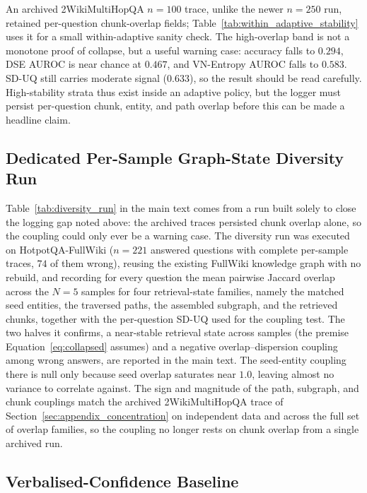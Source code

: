 An archived 2WikiMultiHopQA $n=100$ trace, unlike the newer $n=250$ run,
retained per-question chunk-overlap fields;
Table~\ref{tab:within_adaptive_stability} uses it for a small
within-adaptive sanity check.
The high-overlap band is not a monotone proof of collapse, but a useful
warning case: accuracy falls to $0.294$, DSE AUROC is near chance at $0.467$,
and VN-Entropy AUROC falls to $0.583$.
SD-UQ still carries moderate signal ($0.633$), so the result should be read
carefully.
High-stability strata thus exist inside an adaptive policy, but the logger
must persist per-question chunk, entity, and path overlap before this can be
made a headline claim.



\subsection{Dedicated Per-Sample Graph-State Diversity Run}
\label{sec:appendix_diversity}

Table~\ref{tab:diversity_run} in the main text comes from a run built solely to
close the logging gap noted above: the archived traces persisted chunk overlap
alone, so the coupling could only ever be a warning case.
The diversity run was executed on HotpotQA-FullWiki ($n=221$ answered questions
with complete per-sample traces, $74$ of them wrong), reusing the existing
FullWiki knowledge graph with no rebuild, and recording for every question the
mean pairwise Jaccard overlap across the $N=5$ samples for four retrieval-state
families, namely the matched seed entities, the traversed paths, the assembled
subgraph, and the retrieved chunks, together with the per-question SD-UQ used
for the coupling test.
The two halves it confirms, a near-stable retrieval state across samples
(the premise Equation~\eqref{eq:collapsed} assumes) and a negative
overlap--dispersion coupling among wrong answers, are reported in the main
text.
The seed-entity coupling there is null only because seed overlap saturates near
$1.0$, leaving almost no variance to correlate against.
The sign and magnitude of the path, subgraph, and chunk couplings match the
archived 2WikiMultiHopQA trace of Section~\ref{sec:appendix_concentration} on
independent data and across the full set of overlap families, so the coupling no
longer rests on chunk overlap from a single archived run.

\subsection{Verbalised-Confidence Baseline}
\label{sec:appendix_verbalized}

